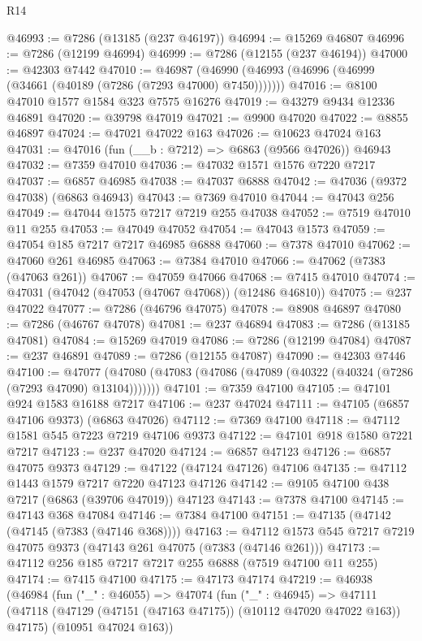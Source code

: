 \begin{lexlean}{R14}
\begin{coremodule}
@46993 := @7286 (@13185 (@237 @46197))
@46994 := @15269 @46807
@46996 := @7286 (@12199 @46994)
@46999 := @7286 (@12155 (@237 @46194))
@47000 := @42303 @7442
@47010 := @46987 (@46990 (@46993 (@46996 (@46999 (@34661 (@40189 (@7286 (@7293 @47000) @7450)))))))
@47016 := @8100 @47010 @1577 @1584 @323 @7575 @16276
@47019 := @43279 @9434 @12336 @46891
@47020 := @39798 @47019
@47021 := @9900 @47020
@47022 := @8855 @46897
@47024 := @47021 @47022 @163
@47026 := @10623 @47024 @163
@47031 := @47016 (fun (__b : @7212) => @6863 (@9566 @47026)) @46943
@47032 := @7359 @47010
@47036 := @47032 @1571 @1576 @7220 @7217
@47037 := @6857 @46985
@47038 := @47037 @6888
@47042 := @47036 (@9372 @47038) (@6863 @46943)
@47043 := @7369 @47010
@47044 := @47043 @256
@47049 := @47044 @1575 @7217 @7219 @255 @47038
@47052 := @7519 @47010 @11 @255
@47053 := @47049 @47052
@47054 := @47043 @1573
@47059 := @47054 @185 @7217 @7217 @46985 @6888
@47060 := @7378 @47010
@47062 := @47060 @261 @46985
@47063 := @7384 @47010
@47066 := @47062 (@7383 (@47063 @261))
@47067 := @47059 @47066
@47068 := @7415 @47010
@47074 := @47031 (@47042 (@47053 (@47067 @47068)) (@12486 @46810))
@47075 := @237 @47022
@47077 := @7286 (@46796 @47075)
@47078 := @8908 @46897
@47080 := @7286 (@46767 @47078)
@47081 := @237 @46894
@47083 := @7286 (@13185 @47081)
@47084 := @15269 @47019
@47086 := @7286 (@12199 @47084)
@47087 := @237 @46891
@47089 := @7286 (@12155 @47087)
@47090 := @42303 @7446
@47100 := @47077 (@47080 (@47083 (@47086 (@47089 (@40322 (@40324 (@7286 (@7293 @47090) @13104)))))))
@47101 := @7359 @47100
@47105 := @47101 @924 @1583 @16188 @7217
@47106 := @237 @47024
@47111 := @47105 (@6857 @47106 @9373) (@6863 @47026)
@47112 := @7369 @47100
@47118 := @47112 @1581 @545 @7223 @7219 @47106 @9373
@47122 := @47101 @918 @1580 @7221 @7217
@47123 := @237 @47020
@47124 := @6857 @47123
@47126 := @6857 @47075 @9373
@47129 := @47122 (@47124 @47126) @47106
@47135 := @47112 @1443 @1579 @7217 @7220 @47123 @47126
@47142 := @9105 @47100 @438 @7217 (@6863 (@39706 @47019)) @47123
@47143 := @7378 @47100
@47145 := @47143 @368 @47084
@47146 := @7384 @47100
@47151 := @47135 (@47142 (@47145 (@7383 (@47146 @368))))
@47163 := @47112 @1573 @545 @7217 @7219 @47075 @9373 (@47143 @261 @47075 (@7383 (@47146 @261)))
@47173 := @47112 @256 @185 @7217 @7217 @255 @6888 (@7519 @47100 @11 @255)
@47174 := @7415 @47100
@47175 := @47173 @47174
@47219 := @46938
    (@46984
      (fun ("_" : @46055) =>
      @47074
        (fun ("_" : @46945) =>
        @47111
          (@47118 (@47129 (@47151 (@47163 @47175)) (@10112 @47020 @47022 @163)) @47175)
          (@10951 @47024 @163))

\end{coremodule}
\end{lexlean}
